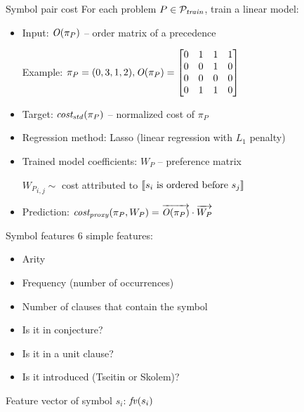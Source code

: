 \documentclass{beamer}
\begin{document}
\begin{frame}{Symbol pair cost}
For each problem $P \in \mathcal{P}_{\mathit{train}}$, train a linear model:

\begin{itemize}
	\item Input: $\operatorname{\mathit{O}}(\pi_P)$ -- order matrix of a precedence
	
	Example: $\pi_P = (0, 3, 1, 2),
	\operatorname{\mathit{O}}(\pi_P) =
	\begin{bmatrix}
	0 & 1 & 1 & 1 \\
	0 & 0 & 1 & 0 \\
	0 & 0 & 0 & 0 \\
	0 & 1 & 1 & 0
	\end{bmatrix}
	$
	\item Target: $\operatorname{\mathit{cost_{std}}}(\pi_P)$ -- normalized cost of $\pi_P$
	\item Regression method: Lasso (linear regression with $L_1$ penalty)
	\item Trained model coefficients: $W_P$ -- preference matrix
	
	${W_P}_{i,j} \sim$ cost attributed to $\left \llbracket s_i\text{ is ordered before }s_j \right \rrbracket$
	\item Prediction: $\operatorname{\mathit{cost_{proxy}}}(\pi_P, W_P) = \overrightarrow{\operatorname{\mathit{O}}(\pi_P)} \cdot \overrightarrow{W_P}$
\end{itemize}
\end{frame}

\begin{frame}{Symbol features}
6 simple features:
\begin{itemize}
	\item Arity
	\item Frequency (number of occurrences)
	\item Number of clauses that contain the symbol
	\item Is it in conjecture?
	\item Is it in a unit clause?
	\item Is it introduced (Tseitin or Skolem)?
\end{itemize}
Feature vector of symbol $s_i$: $\mathit{fv}(s_i)$
\end{frame}
\end{document}
